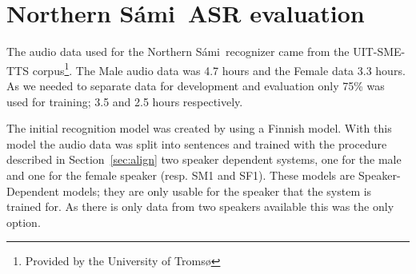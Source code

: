 \documentclass[b5paper]{article}
\newcommand{\ns}{Northern Sámi}
\begin{document}
%
%
%
%





%
%





\section{\ns\ ASR evaluation} 
\label{sec:samiexp}
The audio data used for the \ns\ recognizer came from the UIT-SME-TTS corpus\footnote{Provided by the University of Tromsø}. The Male audio data was 4.7 hours and the Female data 3.3 hours. As we needed to separate data for development and evaluation only 75\% was used for training; 3.5 and 2.5 hours respectively.

The initial recognition model was created by using a Finnish model. With this model the audio data was split into sentences and trained with the procedure described in Section~\ref{sec:align} two speaker dependent systems, one for the male and one for the female speaker (resp. SM1 and SF1). These models are Speaker-Dependent models; they are only usable for the speaker that the system is trained for. As there is only data from two speakers available this was the only option. 
\end{document}
